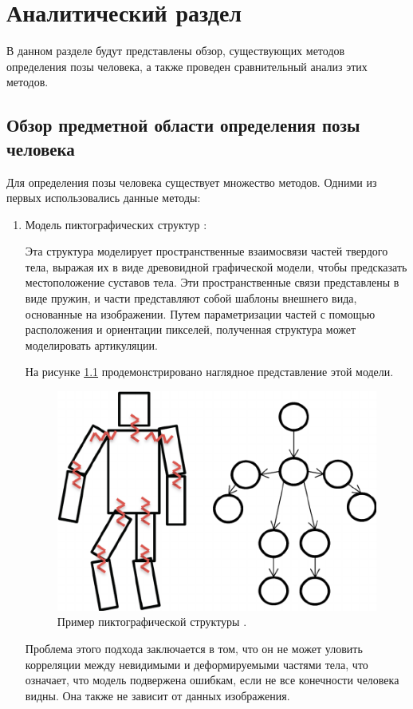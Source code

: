 
\chapter{Аналитический раздел}

В данном разделе будут представлены обзор, существующих методов определения позы человека, а также проведен сравнительный анализ этих методов.

\section{Обзор предметной области определения позы человека}

Для определения позы человека существует множество методов. Одними из первых использовались данные методы: 
\begin{enumerate}[label=\arabic*)]
 	\item Модель пиктографических структур \cite{polygraphic}:
 	
 		Эта структура моделирует пространственные взаимосвязи частей твердого тела, выражая их в виде древовидной графической модели, чтобы предсказать местоположение суставов тела. 
 		Эти пространственные связи представлены в виде пружин, и части представляют собой шаблоны внешнего вида, основанные на изображении. 
 		Путем параметризации частей с помощью расположения и ориентации пикселей, полученная структура может моделировать артикуляции. 
 		
 		На рисунке \ref{img:polygraphic} продемонстрировано наглядное представление этой модели.
 		\begin{figure}[ht!]
 			\centering
 			\includegraphics[width=0.4\linewidth]{assets/pictographical.png}
 			\caption{Пример пиктографической структуры \cite{Pictographical}.}
 			\label{img:polygraphic}
 		\end{figure}
 		\FloatBarrier
 		
 		Проблема этого подхода заключается в том, что он не может уловить корреляции между невидимыми и деформируемыми частями тела, что означает, что модель подвержена ошибкам, если не все конечности человека видны. 
 		Она также не зависит от данных изображения.
 		


\end{enumerate}
